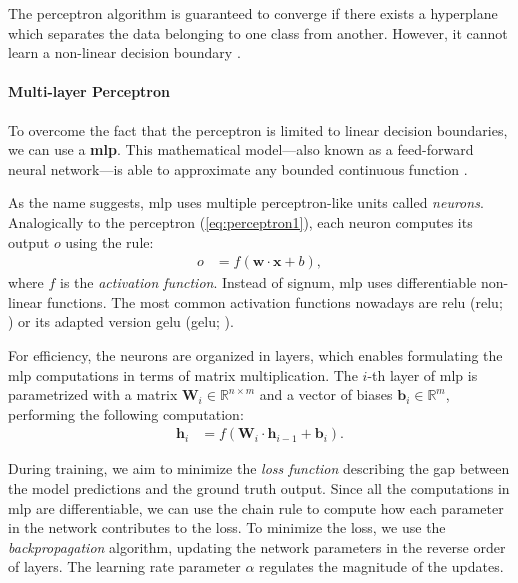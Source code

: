 The perceptron algorithm is guaranteed to converge if there exists a hyperplane which separates the data belonging to one class from another. However, it cannot learn a non-linear decision boundary  \cite{novikoff1962convergence}.

\paragraph{Multi-layer Perceptron} To overcome the fact that the perceptron is limited to linear decision boundaries, we can use a \textbf{\ac{mlp}}. This mathematical model---also known as a feed-forward neural network---is able to approximate any bounded continuous function \cite{hornik1989multilayer}.

As the name suggests, \ac{mlp} uses multiple perceptron-like units called \textit{neurons}. Analogically to the perceptron (\autoref{eq:perceptron1}), each neuron computes its output $o$ using the rule:
\begin{align}
    o & = f(\mathbf{w} \cdot \mathbf{x} + b),
\end{align}
where $f$ is the \emph{activation function}. Instead of signum, \ac{mlp} uses differentiable non-linear functions. The most common activation functions nowadays are \acl{relu} (\acs{relu}; \citealp{nair2010rectified}) or its adapted version \acl{gelu} (\acs{gelu}; \citealp{hendrycks2016gaussian}).

For efficiency, the neurons are organized in layers, which enables formulating the \ac{mlp} computations in terms of matrix multiplication. The $i$-th layer of \ac{mlp} is parametrized with a matrix $\mathbf{W}_i \in \mathbb{R}^{n\times m}$ and a vector of biases $\mathbf{b}_i \in \mathbb{R}^{m}$, performing the following computation:
\begin{align}
    \mathbf{h}_i & = f(\mathbf{W}_i \cdot \mathbf{h}_{i-1} + \mathbf{b}_i).
\end{align}

During training, we aim to minimize the \textit{loss function} describing the gap between the model predictions and the ground truth output. Since all the computations in \ac{mlp} are differentiable, we can use the chain rule to compute how each parameter in the network contributes to the loss. To minimize the loss, we use the \emph{backpropagation} algorithm, updating the network parameters in the reverse order of layers. The learning rate parameter $\alpha$ regulates the magnitude of the updates.

